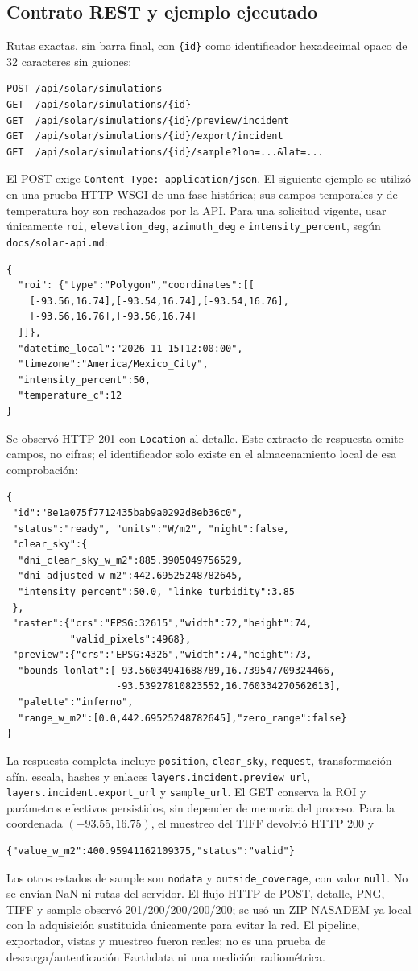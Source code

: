 \documentclass[11pt,a4paper]{article}
\begin{document}
\subsection{Contrato REST y ejemplo ejecutado}
Rutas exactas, sin barra final, con \texttt{\{id\}} como identificador hexadecimal opaco de 32 caracteres sin guiones:
\begin{verbatim}
POST /api/solar/simulations
GET  /api/solar/simulations/{id}
GET  /api/solar/simulations/{id}/preview/incident
GET  /api/solar/simulations/{id}/export/incident
GET  /api/solar/simulations/{id}/sample?lon=...&lat=...
\end{verbatim}
El POST exige \texttt{Content-Type: application/json}. El siguiente ejemplo se utilizó en una prueba HTTP WSGI de una fase histórica; sus campos temporales y de temperatura hoy son rechazados por la API. Para una solicitud vigente, usar únicamente \texttt{roi}, \texttt{elevation\_deg}, \texttt{azimuth\_deg} e \texttt{intensity\_percent}, según \texttt{docs/solar-api.md}:
\begin{verbatim}
{
  "roi": {"type":"Polygon","coordinates":[[
    [-93.56,16.74],[-93.54,16.74],[-93.54,16.76],
    [-93.56,16.76],[-93.56,16.74]
  ]]},
  "datetime_local":"2026-11-15T12:00:00",
  "timezone":"America/Mexico_City",
  "intensity_percent":50,
  "temperature_c":12
}
\end{verbatim}
Se observó HTTP 201 con \texttt{Location} al detalle. Este extracto de respuesta omite campos, no cifras; el identificador solo existe en el almacenamiento local de esa comprobación:
\begin{verbatim}
{
 "id":"8e1a075f7712435bab9a0292d8eb36c0",
 "status":"ready", "units":"W/m2", "night":false,
 "clear_sky":{
  "dni_clear_sky_w_m2":885.3905049756529,
  "dni_adjusted_w_m2":442.69525248782645,
  "intensity_percent":50.0, "linke_turbidity":3.85
 },
 "raster":{"crs":"EPSG:32615","width":72,"height":74,
           "valid_pixels":4968},
 "preview":{"crs":"EPSG:4326","width":74,"height":73,
  "bounds_lonlat":[-93.56034941688789,16.739547709324466,
                   -93.53927810823552,16.760334270562613],
  "palette":"inferno",
  "range_w_m2":[0.0,442.69525248782645],"zero_range":false}
}
\end{verbatim}
La respuesta completa incluye \texttt{position}, \texttt{clear\_sky}, \texttt{request}, transformación afín, escala, hashes y enlaces \texttt{layers.incident.preview\_url}, \texttt{layers.incident.export\_url} y \texttt{sample\_url}. El GET conserva la ROI y parámetros efectivos persistidos, sin depender de memoria del proceso. Para la coordenada $(-93.55,16.75)$, el muestreo del TIFF devolvió HTTP 200 y
\begin{verbatim}
{"value_w_m2":400.95941162109375,"status":"valid"}
\end{verbatim}
Los otros estados de sample son \texttt{nodata} y \texttt{outside\_coverage}, con valor \texttt{null}. No se envían NaN ni rutas del servidor. El flujo HTTP de POST, detalle, PNG, TIFF y sample observó 201/200/200/200/200; se usó un ZIP NASADEM ya local con la adquisición sustituida únicamente para evitar la red. El pipeline, exportador, vistas y muestreo fueron reales; no es una prueba de descarga/autenticación Earthdata ni una medición radiométrica.
\end{document}

